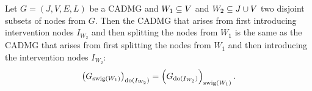 \begin{claimmark}
\begin{Lem}
  Let $G=(J,V,E,L)$ be a CADMG and $W_1 \subseteq V$ and $W_2 \subseteq J \cup V$ two disjoint subsets of nodes from $G$.
    Then the CADMG that arises from first introducing intervention nodes $I_{W_2}$ and then splitting the nodes from $W_1$ is the same as the CADMG that arises from first splitting the nodes from $W_1$ and then introducing the intervention nodes $I_{W_2}$:
    \[  \left ( G_{\mathrm{swig}(W_1)} \right )_{\operatorname{do}(I_{W_2})} = \left ( G_{\operatorname{do}(I_{W_2})} \right )_{\mathrm{swig}(W_1)}. \]
\end{Lem}
\end{claimmark}
